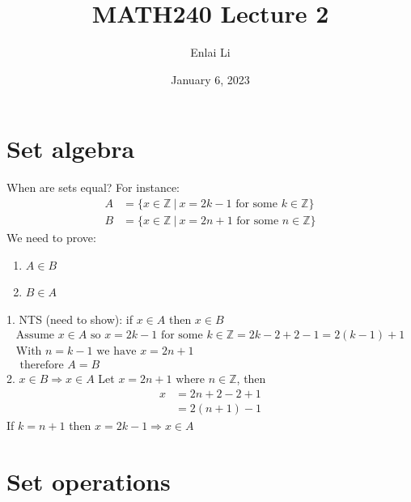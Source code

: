 \documentclass{article}
\author{Enlai Li}
\title{MATH240 \textendash{} Lecture 2}
\date{January 6, 2023}
\begin{document}
\maketitle
\section{Set algebra}
When are sets equal? For instance:
\begin{align*}
    A & = \{x \in \mathbb{Z} \ | \ x=2k-1 \text{ for some } k \in \mathbb{Z}\} \\
    B & = \{x \in \mathbb{Z} \ | \ x=2n+1 \text{ for some } n \in \mathbb{Z}\}
\end{align*}
We need to prove:
\begin{enumerate}
    \item $A \in B$
    \item $B \in A$
\end{enumerate}
1. NTS (need to show): if $x \in A$ then $x \in B$
\begin{gather*}
    \text{Assume } x \in A \text{ so } x = 2k-1 \text{ for some }k\in \mathbb{Z}
    = 2k-2+2-1
    =2(k-1)+1  \\
    \text{With }n=k-1 \text{ we have }x=2n+1 \\ \text{ therefore } A=B
\end{gather*}
2. $x \in B \Rightarrow x\in A$
Let $x=2n+1 \text{ where } n\in \mathbb{Z}$, then
\begin{align*}
    x & =2n+2-2+1 \\
      & =2(n+1)-1
\end{align*}
If $k=n+1$ then $x=2k-1 \Rightarrow x\in A$

\section{Set operations}
\end{document}
